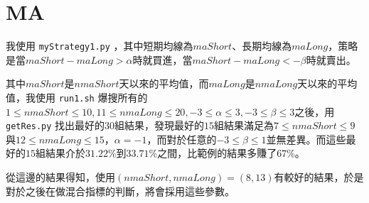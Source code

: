 \section{MA}

我使用 \texttt{myStrategy1.py} ，其中短期均線為$maShort$、長期均線為$maLong$，策略是當$maShort-maLong>\alpha$時就買進，當$maShort-maLong<-\beta$時就賣出。

其中$maShort$是$nmaShort$天以來的平均值，而$maLong$是$nmaLong$天以來的平均值，我使用 \texttt{run1.sh} 爆搜所有的$1\leq nmaShort\leq10, 11\leq nmaLong\leq20, -3\leq\alpha\leq3, -3\leq\beta\leq3$之後，用 \texttt{getRes.py} 找出最好的$30$組結果，發現最好的$15$組結果滿足為$7\leq nmaShort\leq9$與$12\leq nmaLong\leq15$，$\alpha=-1$，而對於任意的$-3\leq\beta\leq1$並無差異。而這些最好的$15$組結果介於$31.22\%$到$33.71\%$之間，比範例的結果多賺了$67\%$。

從這邊的結果得知，使用$(nmaShort, nmaLong)=(8, 13)$有較好的結果，於是對於之後在做混合指標的判斷，將會採用這些參數。
